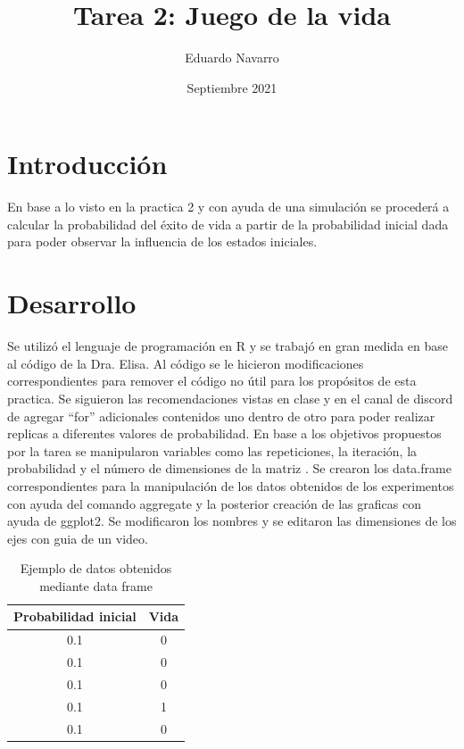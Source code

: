 \documentclass{article}
\title{Tarea 2:
Juego de la vida}
\author{Eduardo Navarro}
\date{Septiembre 2021}
\begin{document}
\maketitle

\section{Introducción}

En base a lo visto en la practica 2 y con ayuda de una simulación se procederá a calcular la probabilidad del éxito de vida a partir de la probabilidad inicial dada para poder observar la influencia de los estados iniciales.

\section{Desarrollo}
Se utilizó el lenguaje de programación en R y se trabajó en gran medida en base al código de la Dra. Elisa\cite{DraElisa}. Al código se le hicieron modificaciones correspondientes para remover el código no útil para los propósitos de esta practica. Se siguieron las recomendaciones vistas en clase y en el canal de discord de agregar “for” adicionales contenidos uno dentro de otro para poder realizar replicas a diferentes valores de probabilidad. En base a los objetivos propuestos por la tarea se manipularon variables como las repeticiones, la iteración, la probabilidad y el número de dimensiones de la matriz \cite{automata}. Se crearon los data.frame correspondientes para la manipulación de los datos obtenidos de los experimentos con ayuda del comando aggregate\cite{youtubeaggregate} y la posterior creación de las graficas con ayuda de ggplot2\cite{hadley}. Se modificaron los nombres y se editaron las dimensiones de los ejes con guia de un video\cite{youtubePlot}.


\begin{table}[h!]
\begin{center}
\begin{tabular}{|c|c|}
\hline
Probabilidad inicial & Vida \\ \hline
0.1 & 0\\ \hline
0.1 & 0\\ \hline
0.1 & 0\\ \hline
0.1 & 1\\ \hline
0.1 & 0\\ \hline
\end{tabular}
\caption{Ejemplo de datos obtenidos mediante data frame}
\label{Tab:Tabla1}
\end{center}
\end{table}
\end{document}
